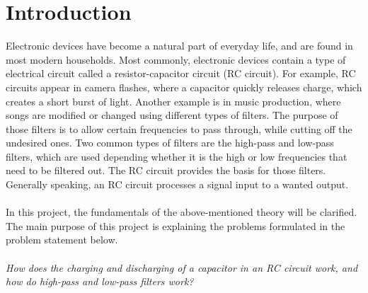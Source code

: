 \chapter{Introduction}
Electronic devices have become a natural part of everyday life, and are found in most modern households. Most commonly, electronic devices contain a type of electrical circuit called a resistor-capacitor circuit (RC circuit). For example, RC circuits appear in camera flashes, where a capacitor quickly releases charge, which creates a short burst of light. Another example is in music production, where songs are modified or changed using different types of filters. The purpose of those filters is to allow certain frequencies to pass through, while cutting off the undesired ones. Two common types of filters are the high-pass and low-pass filters, which are used depending whether it is the high or low frequencies that need to be filtered out. The RC circuit provides the basis for those filters. Generally speaking, an RC circuit processes a signal input to a wanted output. 
\\ \\
In this project, the fundamentals of the above-mentioned theory will be clarified. The main purpose of this project is explaining the problems formulated in the problem statement below.
\\ \\
\textit{How does the charging and discharging of a capacitor in an RC circuit work, and how do high-pass and low-pass filters work?}

